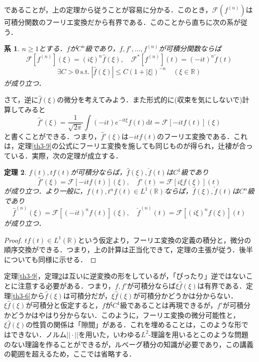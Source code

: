 \documentclass[a4j]{jsbook}
\newtheorem{theorem}{定理}
\newtheorem{cor}[theorem]{系}
\numberwithin{theorem}{chapter}  %
\begin{document}
であることが，上の定理から従うことが容易に分かる．このとき，\(\mathcal{F}\left(f^{(n)}\right)\)は可積分関数のフーリエ変換だから有界である．このことから直ちに次の系が従う．
\begin{cor}
\label{cor3-10}
\(n\geq 1\)とする．\(f\)が\(C^n\)級であり，\(f, f', \dots, f^{(n)}\)が可積分関数ならば
\begin{equation*}
    \mathcal{F}\left[f^{(n)}\right](\xi)=(i\xi)^n\hat{f}(\xi),\quad\mathcal{F}^*\left[f^{(n)}\right](t)=(-it)^n\check{f}(t)
\end{equation*}
\begin{equation*}
    \exists C>0\ \mathrm{s.t.}\ \left|\hat{f}(\xi)\right|\leq C\left(1+|\xi|\right)^{-n}\quad(\xi\in\mathbb{R})
\end{equation*}
が成り立つ．
\end{cor}
さて，逆に\(\hat{f}(\xi)\)の微分を考えてみよう．また形式的に(収束を気にしないで)計算してみると
\begin{equation*}
    \hat{f}'(\xi)=\frac{1}{\sqrt{2\pi}}\int (-it)e^{-it\xi}f(t)\mathrm{d}t=\mathcal{F}[-itf(t)](\xi)
\end{equation*}
と書くことができる．つまり，\(\hat{f}'(\xi)\)は\(-itf(t)\)のフーリエ変換である．これは，定理\ref{th3-9}の公式にフーリエ変換を施しても同じものが得られ，辻褄が合っている．実際，次の定理が成立する．
\begin{theorem}
\label{th3-11}
\(f(t), tf(t)\)が可積分ならば，\(\hat{f}(\xi), \check{f}(t)\)は\(C^1\)級であり
\begin{equation*}
    \hat{f}'(\xi)=\mathcal{F}[-itf(t)](\xi),\quad\check{f}'(t)=\mathcal{F}[i\xi f(\xi)](t)
\end{equation*}
が成り立つ．より一般に，\(f(t), t^nf(t)\in L^1(\mathbb{R})\)ならば，\(\hat{f}(\xi), \check{f}(t)\)は\(C^n\)級であり
\begin{equation*}
    \hat{f}^{(n)}(\xi)=\mathcal{F}[(-it)^n f(t)](\xi),\quad\check{f}^{(n)}(t)=\mathcal{F}[(i\xi)^n f(\xi)](t)
\end{equation*}
が成り立つ．
\end{theorem}
\begin{proof}
\(tf(t)\in L^1(\mathbb{R})\)という仮定より，フーリエ変換の定義の積分と，微分の順序交換ができる．つまり，上の計算は正当化できて，定理の主張が従う．後半についても同様に示せる．
\end{proof}
定理\ref{th3-9}，定理\ref{th3-11}は互いに逆変換の形をしているが，「ぴったり」逆ではないことに注意する必要がある．つまり，\(f, f'\)が可積分ならば\(\xi\hat{f}(\xi)\)は有界である．定理\ref{th3-6}から\(\hat{f}(\xi)\)は可積分だが，\(\xi\hat{f}(\xi)\)が可積分かどうかは分からない．\(\xi\hat{f}(\xi)\)が可積分と仮定すると，\(f\)が\(C^1\)級であることは再現できるが，\(f'\)が可積分かどうかはやはり分からない．このように，フーリエ変換の微分可能性と，\(\xi\hat{f}(\xi)\)の性質の関係は「隙間」がある．これを埋めることは，このような形ではできない．ノルム\(||\cdot||\)を用いた，いわゆる\(L^2\)-理論を用いるとこのような問題のない理論を作ることができるが，ルベーグ積分の知識が必要であり，この講義の範囲を超えるため，ここでは省略する．
\end{document}
